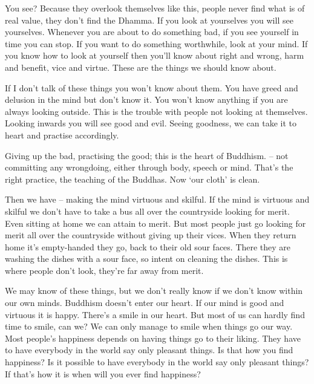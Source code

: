 You see? Because they overlook themselves like this, people never find what is of real value, they don't find the Dhamma. If you look at yourselves you will see yourselves. Whenever you are about to do something bad, if you see yourself in time you can stop. If you want to do something worthwhile, look at your mind. If you know how to look at yourself then you'll know about right and wrong, harm and benefit, vice and virtue. These are the things we should know about.

If I don't talk of these things you won't know about them. You have greed and delusion in the mind but don't know it. You won't know anything if you are always looking outside. This is the trouble with people not looking at themselves. Looking inwards you will see good and evil. Seeing goodness, we can take it to heart and practise accordingly.

Giving up the bad, practising the good; this is the heart of Buddhism.  -- not committing any wrongdoing, either through body, speech or mind. That's the right practice, the teaching of the Buddhas. Now `our cloth' is clean.

Then we have  -- making the mind virtuous and skilful. If the mind is virtuous and skilful we don't have to take a bus all over the countryside looking for merit. Even sitting at home we can attain to merit. But most people just go looking for merit all over the countryside without giving up their vices. When they return home it's empty-handed they go, back to their old sour faces. There they are washing the dishes with a sour face, so intent on cleaning the dishes. This is where people don't look, they're far away from merit.

We may know of these things, but we don't really know if we don't know within our own minds. Buddhism doesn't enter our heart. If our mind is good and virtuous it is happy. There's a smile in our heart. But most of us can hardly find time to smile, can we? We can only manage to smile when things go our way. Most people's happiness depends on having things go to their liking. They have to have everybody in the world say only pleasant things. Is that how you find happiness? Is it possible to have everybody in the world say only pleasant things? If that's how it is when will you ever find happiness?

